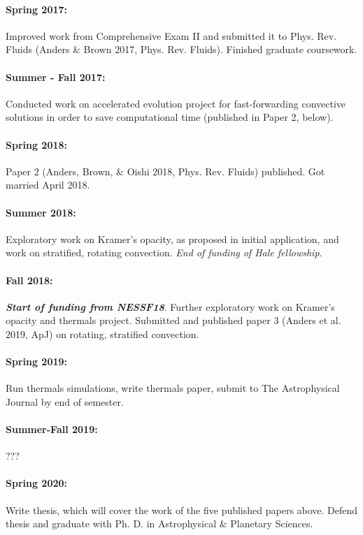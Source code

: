 \documentclass[aasms,12pt]{article}
\begin{document}
\vspace{-0.4cm}
\paragraph{Spring 2017:} Improved work from Comprehensive Exam II and submitted it to Phys.
Rev. Fluids (Anders \& Brown 2017, Phys. Rev. Fluids).  Finished graduate coursework.

\vspace{-0.4cm}
\paragraph{Summer - Fall 2017:}  Conducted work on accelerated evolution project for
fast-forwarding convective solutions in order to save computational time (published in
Paper 2, below).

\vspace{-0.4cm}
\paragraph{Spring 2018:} Paper 2 (Anders, Brown, \& Oishi 2018, Phys. Rev. Fluids) published.
Got married April 2018.

\vspace{-0.4cm}
\paragraph{Summer 2018:}  Exploratory work on Kramer's opacity, as proposed in initial
application, and work on stratified, rotating convection. \emph{End of funding of Hale fellowship}.

\vspace{-0.4cm}
\paragraph{Fall 2018:} \textbf{\emph{Start of funding from NESSF18}}. Further exploratory work
on Kramer's opacity and thermals project. Submitted and
published paper 3 (Anders et al. 2019, ApJ) on rotating, stratified convection.

\vspace{-0.4cm}
\paragraph{Spring 2019:} Run thermals simulations, write thermals paper, submit
to The Astrophysical Journal by end of semester.

\vspace{-0.4cm}
\paragraph{Summer-Fall 2019:} ???

\vspace{-0.4cm}
\paragraph{Spring 2020:} Write thesis, which will cover the work of the five published papers
above.  Defend thesis and graduate with Ph. D. in Astrophysical \& Planetary Sciences.
\end{document}
